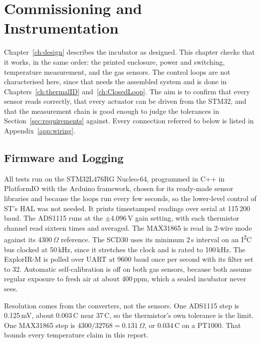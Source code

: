 \chapter{Commissioning and Instrumentation}
\label{ch:commissioning}

Chapter~\ref{ch:design} describes the incubator as designed. This chapter checks that it works, in the same order: the printed enclosure, power and switching, temperature measurement, and the gas sensors. The control loops are not characterised here, since that needs the assembled system and is done in Chapters~\ref{ch:thermalID} and~\ref{ch:ClosedLoop}. The aim is to confirm that every sensor reads correctly, that every actuator can be driven from the STM32, and that the measurement chain is good enough to judge the tolerances in Section~\ref{sec:requirements} against. Every connection referred to below is listed in Appendix~\ref{app:wiring}.

\section{Firmware and Logging}
\label{sec:firmware-settings}

All tests run on the STM32L476RG Nucleo-64, programmed in C++ in PlatformIO with the Arduino framework, chosen for its ready-made sensor libraries and because the loops run every few seconds, so the lower-level control of ST's HAL was not needed. It prints timestamped readings over serial at 115\,200 baud. The ADS1115 runs at the $\pm$4.096\,V gain setting, with each thermistor channel read sixteen times and averaged. The MAX31865 is read in 2-wire mode against its 4300\,$\Omega$ reference. The SCD30 uses its minimum 2\,s interval on an I\textsuperscript{2}C bus clocked at 50\,kHz, since it stretches the clock and is rated to 100\,kHz. The ExplorIR-M is polled over UART at 9600 baud once per second with its filter set to 32. Automatic self-calibration is off on both gas sensors, because both assume regular exposure to fresh air at about 400\,ppm, which a sealed incubator never sees.

Resolution comes from the converters, not the sensors. One ADS1115 step is 0.125\,mV, about 0.003\,\textdegree{}C near 37\,\textdegree{}C, so the thermistor's own tolerance is the limit. One MAX31865 step is $4300/32768 = 0.131$\,$\Omega$, or 0.034\,\textdegree{}C on a PT1000. That bounds every temperature claim in this report.

